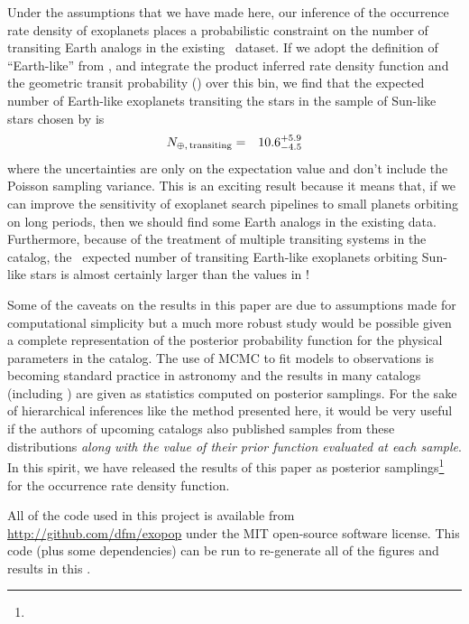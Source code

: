 Under the assumptions that we have made here, our inference of the occurrence
rate density of exoplanets places a probabilistic constraint on the number of
transiting Earth analogs in the existing \kepler\ dataset.
If we adopt the definition of ``Earth-like'' from \citet[][$200 \le
\period/\mathrm{day} < 400$ and $1 \le \radius/\radius_\oplus <
2$]{Petigura:2013},
and integrate the product inferred rate density function and the geometric
transit probability () over this bin, we find that the
expected number of Earth-like exoplanets transiting the stars in the sample of
Sun-like stars chosen by \citet{Petigura:2013} is
\begin{eqnarray}\eqlabel{ntransit}
N_{\oplus,\,\mathrm{transiting}} &=& 10.6_{-4.5}^{+5.9}
\end{eqnarray}
where the uncertainties are only on the expectation value and don't include
the Poisson sampling variance.
This is an exciting result because it means that, if we can improve the
sensitivity of exoplanet search pipelines to small planets orbiting on long
periods, then we should find some Earth analogs in the existing data.
Furthermore, because of the treatment of multiple transiting systems in the
catalog, the \True\ expected number of transiting Earth-like exoplanets
orbiting Sun-like stars is almost certainly larger than the values in
!

Some of the caveats on the results in this paper are due to assumptions made
for computational simplicity but a much more robust study would be possible
given a complete representation of the posterior probability function for the
physical parameters in the catalog.
The use of MCMC to fit models to observations is becoming standard practice in
astronomy and the results in many catalogs (including \citealt{Petigura:2013}) are
given as statistics computed on posterior samplings.
For the sake of hierarchical inferences like the method presented here, it
would be very useful if the authors of upcoming catalogs also published
samples from these distributions \emph{along with the value of their prior
function evaluated at each sample}.
In this spirit, we have released the results of this paper as posterior
samplings\footnote{\resultsurl} for the occurrence rate density function.

All of the code used in this project is available from
\url{http://github.com/dfm/exopop} under the MIT open-source software license.
This code (plus some dependencies) can be run to re-generate all of the
figures and results in this \paper.

